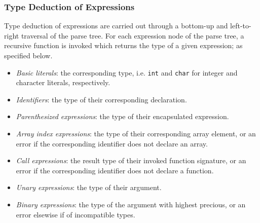 \subsubsection{Type Deduction of Expressions}

Type deduction of expressions are carried out through a bottom-up and left-to-right traversal of the parse tree. For each expression node of the parse tree, a recursive function is invoked which returns the type of a given expression; as specified below.

\begin{itemize}
	\item \textit{Basic literals}: the corresponding type, i.e. \texttt{int} and \texttt{char} for integer and character literals, respectively.
	\item \textit{Identifiers}: the type of their corresponding declaration.
	\item \textit{Parenthesized expressions}: the type of their encapsulated expression.
	\item \textit{Array index expressions}: the type of their corresponding array element, or an error if the corresponding identifier does not declare an array.
	\item \textit{Call expressions}: the result type of their invoked function signature, or an error if the corresponding identifier does not declare a function.
	\item \textit{Unary expressions}: the type of their argument.
	\item \textit{Binary expressions}: the type of the argument with highest precious, or an error elsewise if of incompatible types.
\end{itemize}
